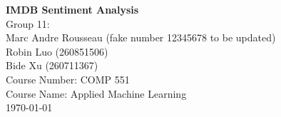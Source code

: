 \begin{titlepage}
\begin{center}

\HRule

\textbf{\Huge IMDB Sentiment Analysis} \\
\bigskip\bigskip\bigskip\bigskip\bigskip\bigskip\bigskip\bigskip\bigskip\bigskip\bigskip
{Group 11: }\\
{Marc Andre Rousseau (fake number 12345678 to be updated)}\\
{Robin Luo (260851506)}\\
{Bide Xu (260711367)}\\
\bigskip\bigskip\bigskip\bigskip\bigskip\bigskip\bigskip\bigskip\bigskip\bigskip\bigskip
{Course Number: COMP 551}\\
{Course Name: Applied Machine Learning}\\
{\today}

\end{center}
\end{titlepage} 
